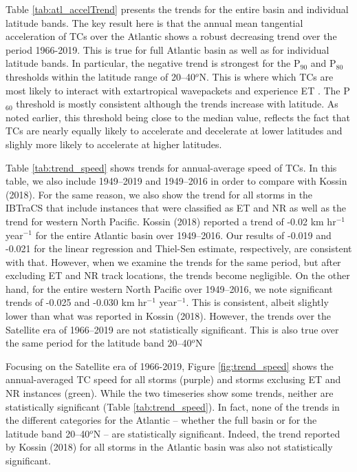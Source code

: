 \documentclass[wcd,manuscript]{copernicus}
\begin{document}
Table \ref{tab:atl_accelTrend} presents the trends for the entire basin and individual latitude bands. The key result here is that the annual mean tangential acceleration of TCs over the Atlantic shows a robust decreasing trend over the period 1966-2019. This is true for full Atlantic basin as well as for individual latitude bands. In particular, the negative trend is strongest for the P$_{90}$ and P$_{80}$thresholds within the latitude range of 20--40$^o$N. This is where which TCs are most likely to interact with extartropical wavepackets and experience ET \citep[e.g.][]{HE2001}. The P$_{60}$ threshold is mostly consistent although the trends increase with latitude. As noted earlier, this threshold being close to the median value, reflects the fact that TCs are nearly equally likely to accelerate and decelerate at lower latitudes and slighly more likely to accelerate at higher latitudes. 



Table \ref{tab:trend_speed} shows trends for annual-average speed of TCs. In this table, we also include 1949--2019 and 1949--2016 in order to compare with Kossin (2018). For the same reason, we also show the trend for all storms in the IBTraCS that include instances that were classified as ET and NR as well as the trend for western North Pacific. Kossin (2018) reported a trend of -0.02 km hr$^{-1}$ year$^{-1}$ for the entire Atlantic basin over 1949--2016. Our results of -0.019 and -0.021 for the linear regression and Thiel-Sen estimate, respectively, are consistent with that. However, when we examine the trends for the same period, but after excluding ET and NR track locations, the trends become negligible. On the other hand, for the entire western North Pacific over 1949--2016, we note significant trends of  -0.025 and -0.030 km hr$^{-1}$ year$^{-1}$.  This is consistent, albeit slightly lower than what was reported in  Kossin (2018). However, the trends over the Satellite era of 1966--2019 are not statistically significant. This is also true over the same period for the latitude band 20--40$^o$N 

Focusing on the Satellite era of 1966-2019,  Figure \ref{fig:trend_speed}  shows the annual-averaged TC speed for all storms (purple) and storms exclusing ET and NR instances (green). While the two timeseries show some trends, neither are statistically significant (Table \ref{tab:trend_speed}).  In fact, none of the trends in the different categories for the Atlantic -- whether the full basin or for the latitude band 20--40$^o$N -- are statistically significant. Indeed, the trend reported by Kossin (2018) for all storms in the Atlantic basin was also not statistically significant. 
\end{document}
